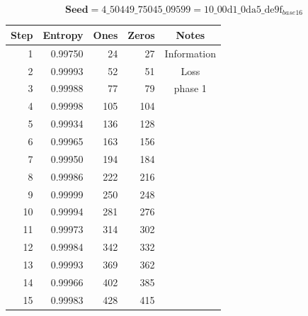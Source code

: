 \documentclass[letterpaper]{article}
\begin{document}
\begin{multicols}{2}
    \noindent
    \begin{minipage}{\columnwidth}
        \setlength{\tabcolsep}{.35\tabcolsep}
        \centering
        $$\textbf{Seed} = 4\_50449\_75045\_09599 = 10\_00\text{d}1\_0\text{da}5\_\text{de}9\text{f}_{base 16}$$
        \begin{tabular}{|r|r|r|r|c|}
            \hline
            \textbf{Step} & \textbf{Entropy} & \textbf{Ones} & \textbf{Zeros} & \textbf{Notes} \\
            \hline
            1                  & 0.99750          & 24            & 27             & Information    \\
            2                  & 0.99993          & 52            & 51             & Loss           \\
            3                  & 0.99988          & 77            & 79             & phase 1        \\
            4                  & 0.99998          & 105           & 104            &                \\
            5                  & 0.99934          & 136           & 128            &                \\
            6                  & 0.99965          & 163           & 156            &                \\
            7                  & 0.99950          & 194           & 184            &                \\
            8                  & 0.99986          & 222           & 216            &                \\
            9                  & 0.99999          & 250           & 248            &                \\
            10                 & 0.99994          & 281           & 276            &                \\
            11                 & 0.99973          & 314           & 302            &                \\
            12                 & 0.99984          & 342           & 332            &                \\
            13                 & 0.99993          & 369           & 362            &                \\
            14                 & 0.99966          & 402           & 385            &                \\
            15                 & 0.99983          & 428           & 415            &                \\

\end{tabular}
\end{minipage}
\end{multicols}
\end{document}
